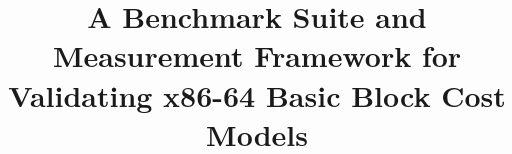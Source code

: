 \documentclass[conference]{IEEEtran}
\begin{document}
\title{A Benchmark Suite and Measurement Framework for Validating x86-64 Basic Block Cost Models}


\maketitle

\thispagestyle{plain}
\pagestyle{plain}















\vspace{12pt}
\end{document}
